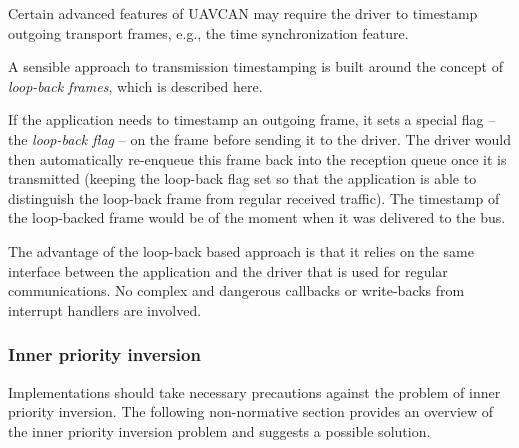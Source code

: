 Certain advanced features of UAVCAN may require the driver to timestamp outgoing transport frames, e.g.,
the time synchronization feature.

\begin{remark}[breakable]
    A sensible approach to transmission timestamping is built around the concept of \emph{loop-back frames},
    which is described here.

    If the application needs to timestamp an outgoing frame, it sets a special flag -- the \emph{loop-back flag} --
    on the frame before sending it to the driver.
    The driver would then automatically re-enqueue this frame back into the reception queue once it is transmitted
    (keeping the loop-back flag set so that the application is able to distinguish the loop-back
    frame from regular received traffic).
    The timestamp of the loop-backed frame would be of the moment when it was delivered to the bus.

    The advantage of the loop-back based approach is that it relies on the same interface between
    the application and the driver that is used for regular communications.
    No complex and dangerous callbacks or write-backs from interrupt handlers are involved.
\end{remark}

\subsubsection{Inner priority inversion}

Implementations should take necessary precautions against the problem of inner priority inversion.
The following non-normative section provides an overview of the inner priority inversion problem and
suggests a possible solution.

